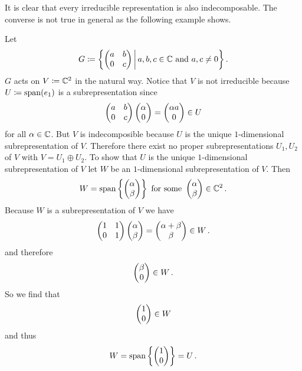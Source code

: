It is clear that every irreducible representation is also indecomposable.
The converse is not true in general as the following example shows.

\begin{example}
  Let
  \[
              G
    \coloneqq \left\{
                \begin{pmatrix}
                  a & b \\
                  0 & c
                \end{pmatrix}
              \,\middle|\,
                a, b, c \in \mathbb{C}
                \text{ and }
                a, c \neq 0
              \right\} .
  \]
  $G$ acts on $V \coloneqq \mathbb{C}^2$ in the natural way.
  Notice that $V$ is not irreducible because $U \coloneqq \operatorname{span}(e_1)$ is a subrepresentation since
  \[
        \begin{pmatrix}
          a & b \\
          0 & c 
        \end{pmatrix}
        \begin{pmatrix}\alpha \\ 0\end{pmatrix}
    =   \begin{pmatrix}\alpha a \\ 0\end{pmatrix}
    \in U
  \]
  for all $\alpha \in \mathbb{C}$.
  But $V$ is indecomposible because $U$ is the unique $1$-dimensional subrepresentation of $V$.
  Therefore there exist no proper subrepresentations $U_1, U_2$ of $V$ with $V = U_1 \oplus U_2$.
  To show that $U$ is the unique $1$-dimensional subrepresentation of $V$ let $W$ be an $1$-dimensional subrepresentation of $V$.
  Then
  \[
      W
    = \operatorname{span}\left\{
              \begin{pmatrix}\alpha \\ \beta\end{pmatrix}
            \right\}
    \text{ for some }
        \begin{pmatrix}\alpha \\ \beta\end{pmatrix}
    \in \mathbb{C}^2 \,.
  \]
  Because $W$ is a subrepresentation of $V$ we have
  \[
        \begin{pmatrix}
          1 & 1 \\
          0 & 1
        \end{pmatrix}
        \begin{pmatrix}\alpha \\ \beta\end{pmatrix}
    =   \begin{pmatrix}\alpha + \beta \\ \beta\end{pmatrix}
    \in W \,.
  \]
  and therefore
  \[
    \begin{pmatrix}\beta \\ 0\end{pmatrix} \in W \,.
  \]
  So we find that
  \[
    \begin{pmatrix}1 \\ 0\end{pmatrix} \in W
  \]
  and thus
  \[
      W
    = \operatorname{span} \left\{ \begin{pmatrix}1 \\ 0\end{pmatrix} \right\}
    = U \,.
  \]
\end{example}


